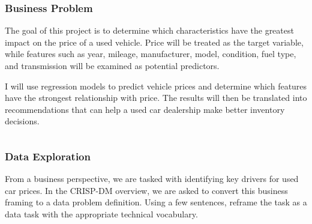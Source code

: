 \documentclass[11pt]{article}
\makeatletter
\newcommand{\boxspacing}{\kern\kvtcb@left@rule\kern\kvtcb@boxsep}
\newcommand{\prompt}[4]{
        {\ttfamily\llap{{\color{#2}[#3]:\hspace{3pt}#4}}\vspace{-\baselineskip}}
    }
\makeatother
\begin{document}
    \hypertarget{business-problem}{%
\subsubsection{Business Problem}\label{business-problem}}

The goal of this project is to determine which characteristics have the
greatest impact on the price of a used vehicle. Price will be treated as
the target variable, while features such as year, mileage, manufacturer,
model, condition, fuel type, and transmission will be examined as
potential predictors.

I will use regression models to predict vehicle prices and determine
which features have the strongest relationship with price. The results
will then be translated into recommendations that can help a used car
dealership make better inventory decisions.

    \begin{tcolorbox}[breakable, size=fbox, boxrule=1pt, pad at break*=1mm,colback=cellbackground, colframe=cellborder]
\prompt{In}{incolor}{ }{\boxspacing}
\begin{Verbatim}[commandchars=\\\{\}]

\end{Verbatim}
\end{tcolorbox}

    \hypertarget{data-exploration}{%
\subsubsection{Data Exploration}\label{data-exploration}}

From a business perspective, we are tasked with identifying key drivers
for used car prices. In the CRISP-DM overview, we are asked to convert
this business framing to a data problem definition. Using a few
sentences, reframe the task as a data task with the appropriate
technical vocabulary.
\end{document}
